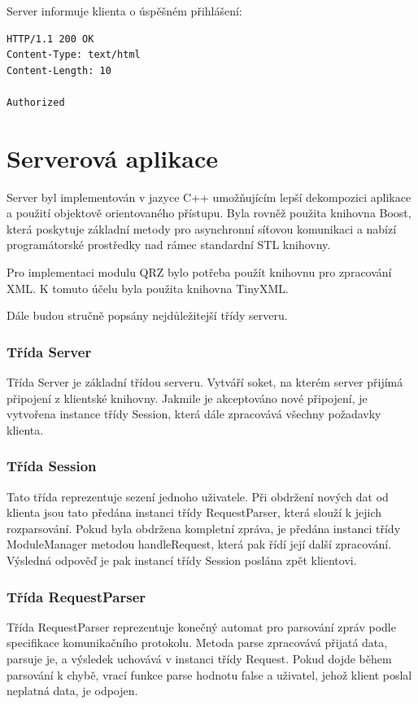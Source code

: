 Server informuje klienta o úspěšném přihlášení:
\begin{verbatim}
HTTP/1.1 200 OK
Content-Type: text/html
Content-Length: 10

Authorized
\end{verbatim}

\section{Serverová aplikace}
\label{implementace_server}

Server byl implementován v jazyce C++ umožňujícím lepší dekompozici aplikace a
použití objektově orientovaného přístupu. Byla rovněž
použita knihovna Boost, která poskytuje základní metody pro asynchronní síťovou komunikaci a nabízí programátorské prostředky
nad rámec standardní STL knihovny.

Pro implementaci modulu QRZ bylo potřeba použít knihovnu pro zpracování XML. K
tomuto účelu byla použita knihovna TinyXML.

Dále budou stručně popsány nejdůležitejší třídy serveru.

\subsubsection{Třída Server}

Třída Server je základní třídou serveru. Vytváří soket, na kterém server přijímá připojení z klientské knihovny. Jakmile je 
akceptováno nové připojení, je vytvořena instance třídy Session, která dále
zpracovává všechny požadavky klienta.

\subsubsection{Třída Session}

Tato třída reprezentuje sezení jednoho uživatele. Při obdržení nových dat od klienta jsou tato předána instanci třídy
RequestParser, která slouží k jejich rozparsování. Pokud byla obdržena kompletní zpráva, je předána instanci třídy 
ModuleManager metodou handleRequest, která pak řídí její další zpracování. Výsledná odpověď je pak instancí třídy Session poslána
zpět klientovi.

\subsubsection{Třída RequestParser}

Třída RequestParser reprezentuje konečný automat pro parsování zpráv podle specifikace komunikačního protokolu.
Metoda parse zpracovává přijatá data, parsuje je, a výsledek uchovává v instanci třídy Request. Pokud dojde během parsování
k chybě, vrací funkce parse hodnotu false a uživatel, jehož klient poslal
neplatná data, je odpojen.

